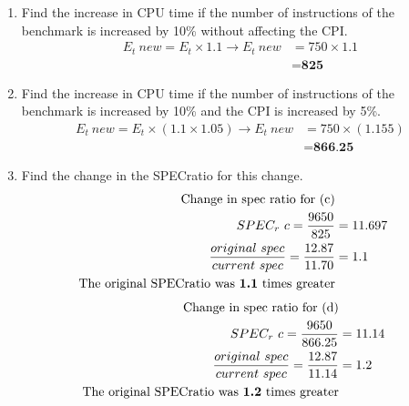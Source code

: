 \documentclass[10pt]{article}
\begin{document}
\begin{enumerate}
\begin{enumerate}
        \item
        Find the increase in CPU time if the number of instructions of the benchmark is increased by 10\% without affecting the CPI.
        \begin{align*}
            E_t\ new = E_t \times 1.1 \rightarrow E_t\ new &= 750 \times 1.1\\
            &= \textbf{825}
        \end{align*}
        \item
        Find the increase in CPU time if the number of instructions of the benchmark is increased by 10\% and the CPI is increased by 5\%.
        \begin{align*}
            E_t\ new = E_t \times (1.1 \times 1.05) \rightarrow E_t\ new &= 750 \times (1.155)\\
            &= \textbf{866.25}
        \end{align*}
        \item
        Find the change in the SPECratio for this change.
        \begin{align*}
            \text{Change in spec ratio for (c)}\\
            SPEC_r\ c = \frac{9650}{825} &= 11.697\\
            \frac{original\ spec}{current\ spec} = \frac{12.87}{11.70} &= 1.1\\
            \text{The original SPECratio was \textbf{1.1} times greater}
        \end{align*}
        \begin{align*}
            \text{Change in spec ratio for (d)}\\
            SPEC_r\ c = \frac{9650}{866.25} &= 11.14\\
            \frac{original\ spec}{current\ spec} = \frac{12.87}{11.14} &= 1.2\\
            \text{The original SPECratio was \textbf{1.2} times greater}
        \end{align*}
        

\end{enumerate}
\end{enumerate}
\end{document}
